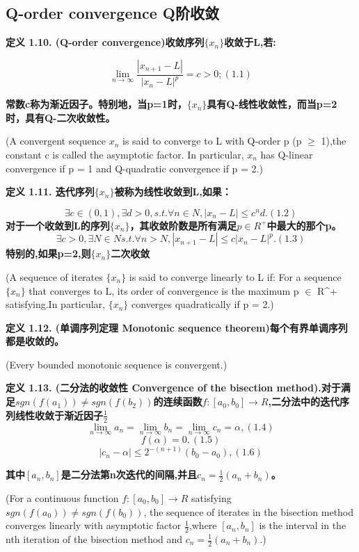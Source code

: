 \documentclass{ctexart}
\begin{document}
\subsection{Q-order convergence Q阶收敛}
\textbf{定义 1.10. (Q-order convergence)收敛序列$\{x_n\}$收敛于L,若:}

\[
\lim_{n \rightarrow \infty} \frac{|x_{n+1} - L|}{|x_n - L|^p} = c > 0; (1.1)
\]

\textbf{常数c称为渐近因子。特别地，当p=1时，$\{x_n\}$具有Q-线性收敛性，而当p=2时，具有Q-二次收敛性。}

(A convergent sequence ${x_n}$ is said to converge to L with Q-order p (p $\ge$ 1),the constant c is called the asymptotic factor. In particular, ${x_n}$ has Q-linear convergence if p = 1 and Q-quadratic convergence if p = 2.)

\textbf{定义 1.11. 迭代序列$\{x_n\}$被称为线性收敛到L,如果：}

\[\exists c \in (0,1),\exists d > 0, s.t. \forall n \in N, |x_n - L| \le c^nd.   (1.2)
\]
\textbf{对于一个收敛到L的序列$\{x_n\}$，其收敛阶数是所有满足$p \in R^+$中最大的那个p。}
\[
\exists c > 0,\exists N \in N s.t. \forall n > N,|x_{n+1}-L| \le c|x_n-L|^p.  (1.3)
\]
\textbf{特别的,如果p=2,则$\{x_n\}$二次收敛}

(A sequence of iterates $\{x_n\}$ is said to converge linearly to L if: For a sequence $\{x_n\}$ that converges to L, its order of convergence is the maximum p $\in$ R^+ satisfying.In particular, $\{x_n\}$ converges quadratically if p = 2.)

\textbf{定义 1.12. (单调序列定理 Monotonic sequence theorem)每个有界单调序列都是收敛的。}

(Every bounded monotonic sequence is convergent.)

\textbf{定义 1.13. (二分法的收敛性 Convergence of the bisection method).对于满足$sgn(f(a_1)) \ne sgn(f(b_2))$的连续函数$f:[a_0,b_0]\rightarrow R$,二分法中的迭代序列线性收敛于渐近因子$\frac{1}{2}$}
\[
\lim_{n \rightarrow \infty} a_n = \lim_{n \rightarrow \infty} b_n = \lim_{n \rightarrow \infty} c_n = \alpha, (1.4)
\]
\[
f(\alpha) = 0, (1.5)
\]
\[
|c_n - \alpha| \le 2^{-(n+1)}(b_0 - a_0), (1.6)
\]

\textbf{其中$[a_n,b_n]$是二分法第n次迭代的间隔,并且$c_n = \frac{1}{2}(a_n+b_n)$。}

(For a continuous function $f : [a_0,b_0] \rightarrow R$ satisfying $sgn(f(a_0)) \ne sgn(f(b_0))$, the sequence of iterates in the bisection method converges linearly with asymptotic factor $\frac{1}{2}$,where $[a_n,b_n]$ is the interval in the nth iteration of the bisection method and $c_n = \frac{1}{2}(a_n + b_n )$.)
\end{document}
